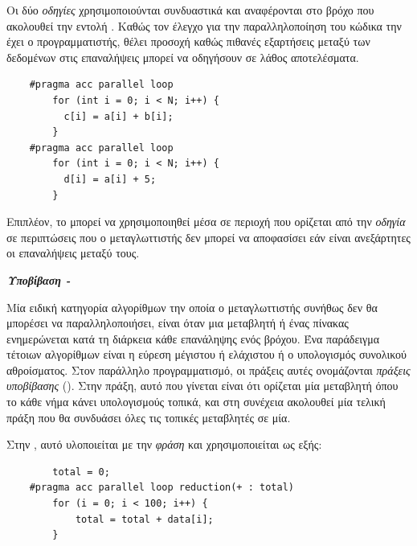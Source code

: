 Οι δύο \textit{οδηγίες} χρησιμοποιούνται συνδυαστικά και αναφέρονται στο βρόχο που ακολουθεί την εντολή . Καθώς τον έλεγχο για την παραλληλοποίηση του κώδικα την έχει ο προγραμματιστής, θέλει προσοχή καθώς πιθανές εξαρτήσεις μεταξύ των δεδομένων στις επαναλήψεις μπορεί να οδηγήσουν σε λάθος αποτελέσματα.
  
\begin{center}
\begin{minipage}{0.5\textwidth}
\begin{verbatim}
    #pragma acc parallel loop
        for (int i = 0; i < N; i++) {
          c[i] = a[i] + b[i];
        }
    #pragma acc parallel loop
        for (int i = 0; i < N; i++) {
          d[i] = a[i] + 5;
        }
\end{verbatim}
\end{minipage}
\end{center}

Επιπλέον, το  μπορεί να χρησιμοποιηθεί μέσα σε περιοχή που ορίζεται από την \textit{οδηγία}  σε περιπτώσεις που ο μεταγλωττιστής δεν μπορεί να αποφασίσει εάν είναι ανεξάρτητες οι επαναλήψεις μεταξύ τους.

\bigskip
\textbf{\textit{Υποβίβαση - }}
\medskip

Μία ειδική κατηγορία αλγορίθμων την οποία ο μεταγλωττιστής συνήθως δεν θα μπορέσει να παραλληλοποιήσει, είναι όταν μια μεταβλητή ή ένας πίνακας ενημερώνεται κατά τη διάρκεια κάθε επανάληψης ενός βρόχου. Ένα παράδειγμα τέτοιων αλγορίθμων είναι η εύρεση μέγιστου ή ελάχιστου ή ο υπολογισμός συνολικού αθροίσματος. Στον παράλληλο προγραμματισμό, οι πράξεις αυτές ονομάζονται \textit{πράξεις υποβίβασης} (). Στην πράξη, αυτό που γίνεται είναι ότι ορίζεται μία μεταβλητή όπου το κάθε νήμα κάνει υπολογισμούς τοπικά, και στη συνέχεια ακολουθεί μία τελική πράξη που θα συνδυάσει όλες τις τοπικές μεταβλητές σε μία. 

Στην , αυτό υλοποιείται με την \textit{φράση}  και χρησιμοποιείται ως εξής: 

\begin{center}
\begin{minipage}{0.5\textwidth}
\begin{verbatim}
        total = 0;
    #pragma acc parallel loop reduction(+ : total)
        for (i = 0; i < 100; i++) {
            total = total + data[i];
        }
\end{verbatim}
\end{minipage}
\end{center}

